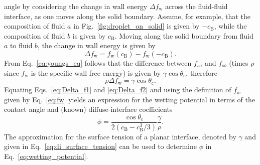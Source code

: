 angle by considering the change in wall energy $\Delta 
f_\text{w}$ across the 
fluid-fluid interface, as one moves along the solid boundary. Assume, for 
example, that the composition of fluid $a$ in Fig.~\ref{fig:droplet_on_solid} 
is given by $-c_\text{B}$, while the composition of fluid $b$ is given by 
$c_\text{B}$. Moving along the solid boundary from fluid $a$ to fluid $b$, the 
change in wall energy is given by
\begin{equation}
\Delta f_\text{w}=f_\text{w}(c_\text{B}) - f_\text{w}(-c_\text{B}).
\label{eq:Delta_f1}
\end{equation}
From 
Eq.~\eqref{eq:youngs_eq} follows that the difference between $f_{sa}$ and 
$f_{sb}$ (times $\rho$ since $f_\text{w}$ is the specific wall free energy) 
is given by $\gamma \cos \theta_\text{c}$, therefore 
\begin{equation}
\rho \Delta f_\text{w}=\gamma \cos \theta_\text{c}. \label{eq:Delta_f2}
\end{equation}
Equating Eqs.~\eqref{eq:Delta_f1} and \eqref{eq:Delta_f2} and using the definition 
of $f_w$ given by Eq.~\eqref{eq:fw} yields an expression for the wetting 
potential in terms of the contact angle and (known) diffuse-interface 
coefficients
\begin{equation}
\phi = \frac{\cos \theta_\text{c}}{2(c_\text{B} -c_\text{B}^3/3 )} 
\frac{\gamma}{\rho}.
\label{eq:wetting_potential}
\end{equation}
The approximation for the surface tension of a planar interface, denoted by
$\gamma$ and given in Eq.~\eqref{eq:di_surface_tension} can be used to
 determine $\phi$ in Eq.~\eqref{eq:wetting_potential}.

